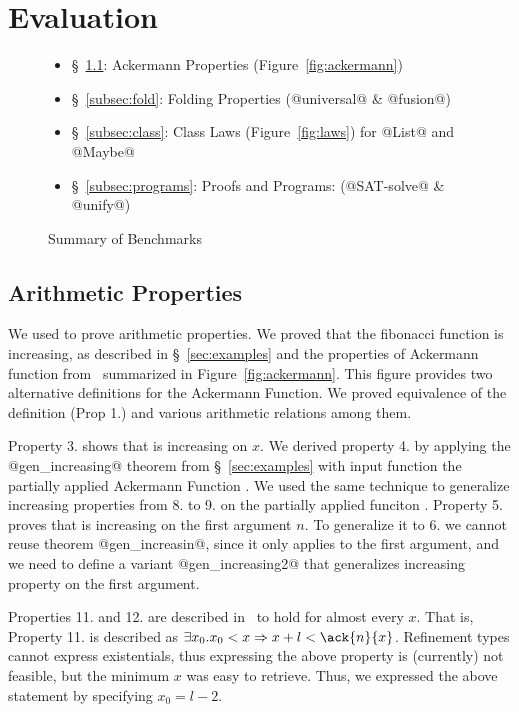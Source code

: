 \section{Evaluation}\label{sec:evaluation}


\begin{figure}
\begin{itemize}
\item \S~\ref{subsec:ackermann}: Ackermann Properties (Figure~\ref{fig:ackermann})
\item \S~\ref{subsec:fold}: Folding Properties (@universal@ \& @fusion@)
\item \S~\ref{subsec:class}: Class Laws (Figure~\ref{fig:laws}) for @List@ and @Maybe@
\item \S~\ref{subsec:programs}: Proofs and Programs: (@SAT-solve@ \& @unify@)
\end{itemize}
\caption{Summary of Benchmarks}
\label{fig:summary}
\end{figure}


\subsection{Arithmetic Properties}\label{subsec:ackermann}

We used \libname to prove arithmetic properties.
We proved that the fibonacci function is increasing,
as described in \S~\ref{sec:examples}
and the properties of Ackermann function
from~\citep{ackermann} summarized in
Figure~\ref{fig:ackermann}.
%
This figure provides two alternative definitions
for the Ackermann Function. We proved equivalence
of the definition (Prop 1.) and various arithmetic
relations among them.


Property 3. shows that  is increasing on $x$.
We derived property 4. by applying the\\
\hbox{@gen_increasing@} theorem
from \S~\ref{sec:examples} with input function
the partially applied Ackermann Function .
%
We used the same technique to generalize increasing properties
from 8. to 9. on the partially applied funciton .
%
Property 5. proves that  is increasing on the first argument $n$.
To generalize it to 6. we cannot reuse theorem @gen_increasin@,
since it only applies to the first argument,
and we need to define a variant @gen_increasing2@ that
generalizes increasing property on the first argument.

Properties 11. and 12. are described in~\citep{ackermann}
to hold for almost every $x$.
%
That is, Property 11. is described as
$\exists x_0. x_0 < x \Rightarrow x + l < \ack{n}{x}$.
%
Refinement types cannot express existentials,
thus expressing the above property is (currently)
not feasible, but the minimum $x$ was easy to retrieve.
Thus, we expressed the above statement by specifying $x_0 = l-2$.

